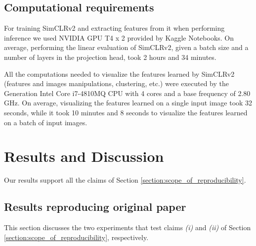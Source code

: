     
    
    
    
    \subsection{Computational requirements}
    For training SimCLRv2 and extracting features from it when performing inference we used NVIDIA GPU T4 x 2 provided by Kaggle Notebooks. On average, performing the linear evaluation of SimCLRv2, given a batch size and a number of layers in the projection head, took 2 hours and 34 minutes.  
    
    All the computations needed to visualize the features learned by SimCLRv2 (features and images manipulations, clustering, etc.) were executed by the  Generation Intel Core i7-4810MQ CPU with 4 cores and a base frequency of 2.80 GHz. On average, visualizing the features learned on a single input image took 32 seconds, while it took 10 minutes and 8 seconds to visualize the features learned on a batch of input images.
    

\section{Results and Discussion}

Our results support all the claims of Section \ref{section:scope_of_reproducibility}.

\subsection{Results reproducing original paper}
This section discusses the two experiments that test claims \textit{(i)} and \textit{(ii)} of Section \ref{section:scope_of_reproducibility}, respectively.


